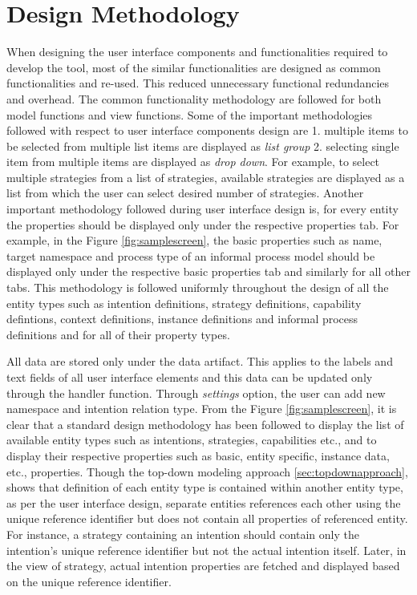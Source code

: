 \section{Design Methodology}
\label{sec:designmethodology}
When designing the user interface components and functionalities required to develop the tool, most of the similar functionalities are 
designed as common functionalities and re-used. This reduced unnecessary functional redundancies and overhead. The common functionality methodology are followed for both model functions and view functions.  Some of the important methodologies followed with respect to user interface components design are 1. multiple items to be selected from multiple list items are displayed as  \textit{list group} 2. selecting single item from multiple items are displayed as \textit{drop down}. For example, to select multiple strategies from a list of strategies, available strategies are displayed as a list from which the user can select desired number of strategies. Another important methodology followed during user interface design is, for every entity the properties should be displayed only under the respective properties tab. For example, in the Figure \ref{fig:samplescreen}, the basic properties such as name, target namespace and process type of an informal process model should be displayed only under the respective basic properties tab and similarly for all other tabs. This methodology is followed uniformly throughout the design of all the entity types such as intention definitions, strategy definitions, capability defintions, context definitions, instance definitions and informal process definitions and for all of their property types. 

All data are stored only under the data artifact. This applies to the labels and text fields of all user interface elements and this data can be updated only through the handler function. Through \textit{settings} option, the user can add new namespace and intention relation type. From the Figure \ref{fig:samplescreen}, it is clear that a standard design methodology has been followed to display the list of available entity types such as intentions, strategies, capabilities etc., and to display their respective properties such as basic, entity specific, instance data, etc., properties. Though the top-down modeling approach \ref{sec:topdownapproach}, shows that definition of each entity type is contained within another entity type, as per the user interface design, separate entities references each other using the unique reference identifier but does not contain all properties of referenced entity. For instance, a strategy containing an intention should contain only the intention's unique reference identifier but not the actual intention itself. Later, in the view of strategy, actual intention properties are fetched and displayed based on the unique reference identifier. 

